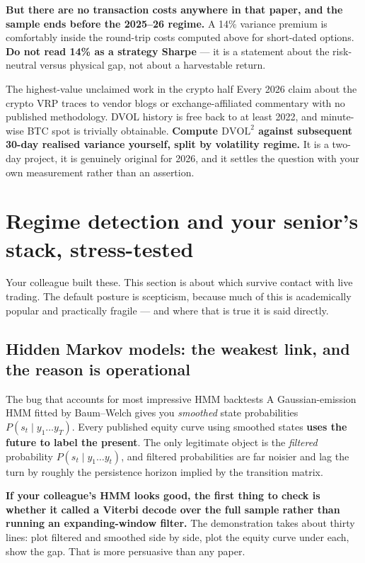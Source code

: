 \documentclass[11pt,a4paper]{article}
\begin{document}
\textbf{But there are no transaction costs anywhere in that paper, and the sample
ends before the 2025--26 regime.} A 14\% variance premium is comfortably inside
the round-trip costs computed above for short-dated options. \textbf{Do not read
14\% as a strategy Sharpe} --- it is a statement about the risk-neutral versus
physical gap, not about a harvestable return.

\begin{keyfact}{The highest-value unclaimed work in the crypto half}
Every 2026 claim about the crypto VRP traces to vendor blogs or exchange-affiliated
commentary with no published methodology. DVOL history is free back to at least
2022, and minute-wise BTC spot is trivially obtainable. \textbf{Compute
$\text{DVOL}^2$ against subsequent 30-day realised variance yourself, split by
volatility regime.} It is a two-day project, it is genuinely original for 2026,
and it settles the question with your own measurement rather than an assertion.
\end{keyfact}

\newpage
\section{Regime detection and your senior's stack, stress-tested}
\label{sec:regime}

Your colleague built these. This section is about which survive contact with live
trading. The default posture is scepticism, because much of this is academically
popular and practically fragile --- and where that is true it is said directly.

\subsection{Hidden Markov models: the weakest link, and the reason is operational}

\begin{keyfact}{The bug that accounts for most impressive HMM backtests}
A Gaussian-emission HMM fitted by Baum--Welch gives you \emph{smoothed} state
probabilities $P(s_t \mid y_1 \ldots y_T)$. Every published equity curve using
smoothed states \textbf{uses the future to label the present}. The only legitimate
object is the \emph{filtered} probability $P(s_t \mid y_1 \ldots y_t)$, and
filtered probabilities are far noisier and lag the turn by roughly the persistence
horizon implied by the transition matrix.

\textbf{If your colleague's HMM looks good, the first thing to check is whether it
called a Viterbi decode over the full sample rather than running an
expanding-window filter.} The demonstration takes about thirty lines: plot filtered
and smoothed side by side, plot the equity curve under each, show the gap. That is
more persuasive than any paper.
\end{keyfact}
\end{document}
